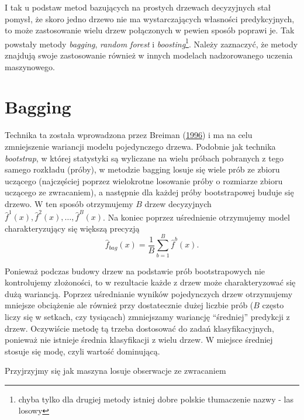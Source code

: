 \documentclass[
]{book}
\theoremstyle{plain}
\theoremstyle{definition}
\theoremstyle{definition}
\theoremstyle{definition}
\theoremstyle{definition}
\theoremstyle{remark}
\begin{document}
I tak u podstaw metod bazujących na prostych drzewach decyzyjnych stał pomysł, że skoro jedno drzewo nie ma wystarczających własności predykcyjnych, to może zastosowanie wielu drzew połączonych w pewien sposób poprawi je. Tak powstały metody \emph{bagging}, \emph{random forest} i \emph{boosting}\footnote{chyba tylko dla drugiej metody istniej dobre polskie tłumaczenie nazwy - las losowy}. Należy zaznaczyć, że metody znajdują swoje zastosowanie również w innych modelach nadzorowanego uczenia maszynowego.

\hypertarget{bagging}{%
\section{Bagging}\label{bagging}}

Technika ta została wprowadzona przez Breiman (\protect\hyperlink{ref-breiman1996}{1996}) i ma na celu zmniejszenie wariancji modelu pojedynczego drzewa. Podobnie jak technika \emph{bootstrap}, w której statystyki są wyliczane na wielu próbach pobranych z tego samego rozkładu (próby), w metodzie bagging losuje się wiele prób ze zbioru uczącego (najczęściej poprzez wielokrotne losowanie próby o rozmiarze zbioru uczącego ze zwracaniem), a następnie dla każdej próby bootstrapowej buduje się drzewo. W ten sposób otrzymujemy \(B\) drzew decyzyjnych \(\hat{f}^1(x), \hat{f}^2(x),\ldots, \hat{f}^B(x)\). Na koniec poprzez uśrednienie otrzymujemy model charakteryzujący się większą precyzją
\begin{equation}
    \hat{f}_{bag}(x)=\frac1B\sum_{b=1}^B\hat{f}^b(x).
\end{equation}

Ponieważ podczas budowy drzew na podstawie prób bootstrapowych nie kontrolujemy złożoności, to w rezultacie każde z drzew może charakteryzować się dużą wariancją. Poprzez uśrednianie wyników pojedynczych drzew otrzymujemy mniejsze obciążenie ale również przy dostatecznie dużej liczbie prób (\(B\) często liczy się w setkach, czy tysiącach) zmniejszamy wariancję ``średniej'' predykcji z drzew. Oczywiście metodę tą trzeba dostosować do zadań klasyfikacyjnych, ponieważ nie istnieje średnia klasyfikacji z wielu drzew. W miejsce średniej stosuje się modę, czyli wartość dominującą.

Przyjrzyjmy się jak maszyna losuje obserwacje ze zwracaniem
\end{document}
